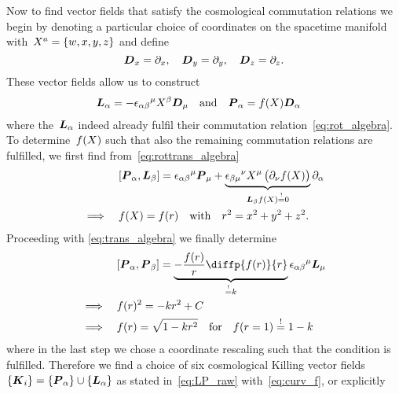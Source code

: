 Now to find vector fields that satisfy the cosmological commutation relations we begin by denoting a particular choice of coordinates on the spacetime manifold with~${X^a=\{w,x,y,z\}}$ and define
\begin{equation}
	\boldsymbol{D}_x=\partial_x
	\mathpunct{,}\quad \boldsymbol{D}_y=\partial_y
	\mathpunct{,}\quad \boldsymbol{D}_z=\partial_z
	\mathpunct{.}
\end{equation}
These vector fields allow us to construct
\begin{align}\label{eq:LP_raw}
	\boldsymbol{L}_\alpha=-{\epsilon_{\alpha\beta}}^\mu X^\beta\boldsymbol{D}_\mu
	\quad &\text{and} \quad
	\boldsymbol{P}_\alpha=f(X)\boldsymbol{D}_\alpha
\end{align}
where the~$\boldsymbol{L}_\alpha$ indeed already fulfil their commutation relation~\eqref{eq:rot_algebra}. To determine~$f(X)$ such that also the remaining commutation relations are fulfilled, we first find from~\eqref{eq:rottrans_algebra}
\begin{align}
	&[{\boldsymbol{P}_\alpha},{\boldsymbol{L}_\beta}]={\epsilon_{\alpha\beta}}^\mu\boldsymbol{P}_\mu+\underbrace{{\epsilon_{\beta\mu}}^\nu X^\mu\left(\partial_\nu f(X)\right)}_{\boldsymbol{L}_\beta f(X)\overset{!}{=}0}\partial_\alpha\\
	\implies \quad &f(X)=f(r) \quad \text{with} \quad r^2=x^2+y^2+z^2
	\mathpunct{.}
\end{align}
Proceeding with \eqref{eq:trans_algebra} we finally determine
\begin{align}
	&\comm{\vect{\Pvec}_\alpha}{\vect{\Pvec}_\beta}=\underbrace{-\frac{\func\of{\coordr}}{\coordr}\diffp{\func\of{\coordr}}{\coordr}}_{\overset{!}{=}\spatcurv}{\levciv_{\alpha\beta}}^\mu\vect{\Lvec}_\mu\\
	\implies \quad &\func\of{\coordr}^2=-\spatcurv\coordr^2+\Const\\
	\implies \quad &\func\of{\coordr}=\sqrt{\curvfact} \quad \text{for} \quad \func\of{\coordr=1}\overset{!}{=}1-\spatcurv \label{eq:curv_f}
\end{align}
where in the last step we chose a coordinate rescaling such that the condition is fulfilled. Therefore we find a choice of six cosmological Killing vector fields~$\left\{\boldsymbol{K}_i\right\}=\left\{\boldsymbol{P}_\alpha\right\}\cup\left\{\boldsymbol{L}_\alpha\right\}$ as stated in~\eqref{eq:LP_raw} with~\eqref{eq:curv_f}, or explicitly
